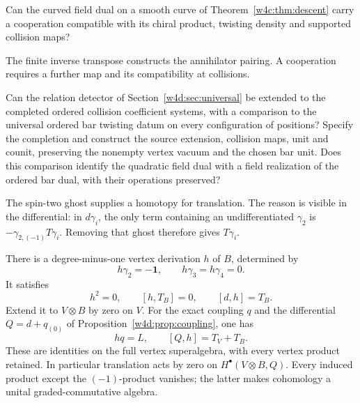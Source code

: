 \begin{question}\label{w4d:qn:descent}
Can the curved field dual on a smooth curve of
Theorem~\ref{w4c:thm:descent} carry a cooperation compatible with
its chiral product, twisting density and supported collision maps?
\end{question}
The finite inverse transpose constructs the annihilator pairing.
A cooperation requires a further map and its compatibility at
collisions.

\begin{question}\label{w4d:qn:bar}
Can the relation detector of Section~\ref{w4d:sec:universal} be extended
to the completed ordered collision coefficient systems, with a
comparison to the universal ordered bar twisting datum on every
configuration of positions? Specify the completion and construct the
source extension, collision maps, unit and counit, preserving the
nonempty vertex vacuum and the chosen bar unit. Does this comparison
identify the quadratic field dual with a field realization of the
ordered bar dual, with their operations preserved?
\end{question}

The spin-two ghost supplies a homotopy for translation. The reason
is visible in the differential: in $d\gamma_i$, the only term
containing an undifferentiated $\gamma_2$ is
$-\gamma_{2,(-1)}T\gamma_i$. Removing that ghost therefore gives
$T\gamma_i$.

\begin{proposition}\label{w4d:prop:cartan}
There is a degree-minus-one vertex derivation $h$ of $B$, determined by
\[
 h\gamma_2=-\mathbf1,\qquad h\gamma_3=h\gamma_4=0.
\]
It satisfies
\[
 h^2=0,\qquad [h,T_B]=0,\qquad [d,h]=T_B.
\]
Extend it to $V\otimes B$ by zero on $V$. For the exact coupling
$q$ and the differential $Q=d+q_{(0)}$ of
Proposition~\ref{w4d:prop:coupling}, one has
\[
 hq=L,\qquad [Q,h]=T_V+T_B.
\]
These are identities on the full vertex superalgebra, with every
vertex product retained. In particular translation acts by zero
on $H^\bullet(V\otimes B,Q)$. Every induced product except the
$(-1)$-product vanishes; the latter makes cohomology a unital
graded-commutative algebra.
\end{proposition}

